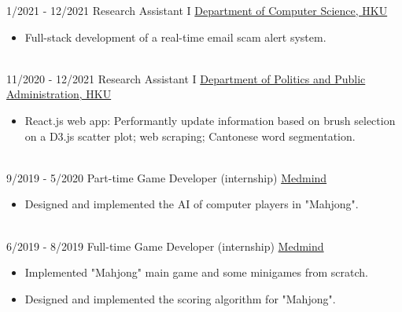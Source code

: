 \documentclass[letterpaper]{twentysecondcv} %
\begin{document}
\begin{twenty}
\twentyitem
		{1/2021 - 12/2021}
	{}
			{Research Assistant I}
			{\href{https://www.cs.hku.hk}{Department of Computer Science, HKU}}
		{}
		{\vspace{-2mm}\begin{itemize}[topsep=0pt,partopsep=0pt]
				\item Full-stack development of a real-time email scam alert system.
				\end{itemize} }\\

\twentyitem
		{11/2020 - 12/2021}
	{}
			{Research Assistant I}
			{\href{https://ppaweb.hku.hk}{Department of Politics and Public Administration, HKU}}
		{}
		{\vspace{-2mm}\begin{itemize}[topsep=0pt,partopsep=0pt]
				\item React.js web app: Performantly update information based on brush selection on a D3.js scatter plot; web scraping; Cantonese word segmentation.
				\end{itemize} }\\

\twentyitem
    	{9/2019 - 5/2020}
		{}
        {Part-time Game Developer (internship)}
        {\href{https://www.medmindtechnology.hk}{Medmind}}
        {}
        {\vspace{-2mm}\begin{itemize}[topsep=0pt,partopsep=0pt]
				\item Designed and implemented the AI of computer players in "Mahjong".
				\end{itemize}} \\
				
	\twentyitem
    	{6/2019 - 8/2019}
		{}
        {Full-time Game Developer (internship)}
        {\href{https://www.medmindtechnology.hk}{Medmind}}
        {}
        {\vspace{-2mm}\begin{itemize}[topsep=0pt,partopsep=0pt]
        \item Implemented "Mahjong" main game and some minigames from scratch.
        \item Designed and implemented the scoring algorithm for "Mahjong".
    \end{itemize}} \\
        
\end{twenty}

\vspace{-0.25cm}
\end{document}
